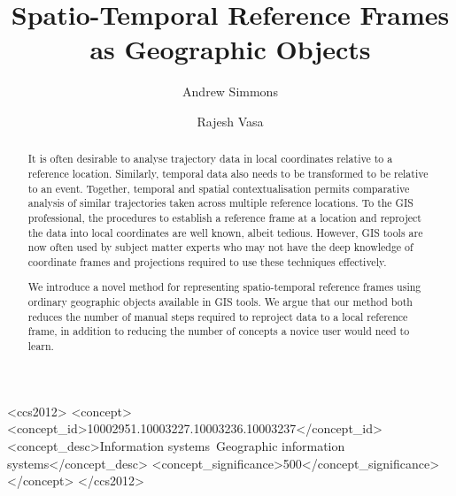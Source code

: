 \documentclass[sigconf]{acmart}
\begin{document}
\title{Spatio-Temporal Reference Frames as Geographic Objects}


\author{Andrew Simmons}

\author{Rajesh Vasa}


\renewcommand{\shortauthors}{A. Simmons and R. Vasa}


\begin{abstract}
  It is often desirable to analyse trajectory data in local coordinates relative to a reference location. Similarly, temporal data also needs to be transformed to be relative to an event. Together, temporal and spatial contextualisation permits comparative analysis of similar trajectories taken across multiple reference locations. To the GIS professional, the procedures to establish a reference frame at a location and reproject the data into local coordinates are well known, albeit tedious. However, GIS tools are now often used by subject matter experts who may not have the deep knowledge of coordinate frames and projections required to use these techniques effectively.

  We introduce a novel method for representing spatio-temporal reference frames using ordinary geographic objects available in GIS tools. We argue that our method both reduces the number of manual steps required to reproject data to a local reference frame, in addition to reducing the number of concepts a novice user would need to learn.
\end{abstract}


\begin{CCSXML}
<ccs2012>
<concept>
<concept_id>10002951.10003227.10003236.10003237</concept_id>
<concept_desc>Information systems~Geographic information systems</concept_desc>
<concept_significance>500</concept_significance>
</concept>
</ccs2012>
\end{CCSXML}




\maketitle





\end{document}
